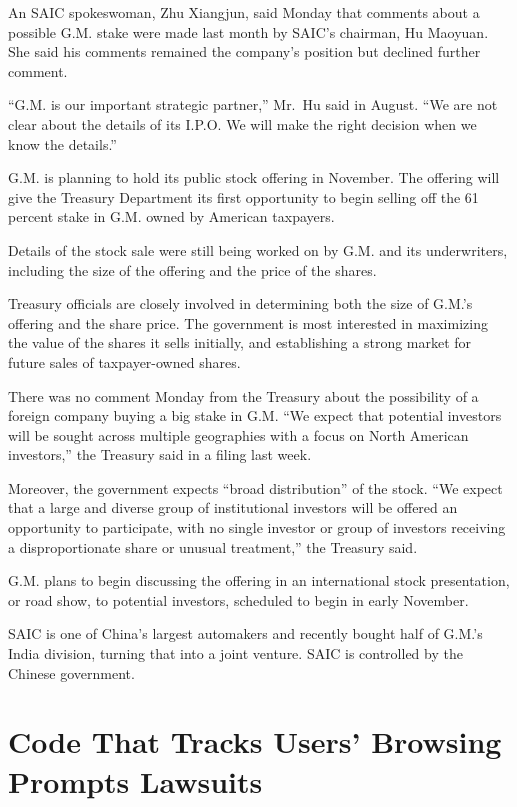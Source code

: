 ﻿\documentclass[12pt]{article}
\begin{document}
An SAIC spokeswoman, Zhu Xiangjun, said Monday that comments about a possible G.M. stake were made
last month by SAIC's chairman, Hu Maoyuan. She said his comments remained the company's position but
declined further comment.

``G.M. is our important strategic partner,'' Mr.~Hu said in August. ``We are not clear about the
details of its I.P.O. We will make the right decision when we know the details.''

G.M. is planning to hold its public stock offering in November. The offering will give the Treasury
Department its first opportunity to begin selling off the 61 percent stake in G.M. owned by American
taxpayers.

Details of the stock sale were still being worked on by G.M. and its underwriters, including the
size of the offering and the price of the shares.

Treasury officials are closely involved in determining both the size of G.M.'s offering and the
share price. The government is most interested in maximizing the value of the shares it sells
initially, and establishing a strong market for future sales of taxpayer-owned shares.

There was no comment Monday from the Treasury about the possibility of a foreign company buying a
big stake in G.M. ``We expect that potential investors will be sought across multiple geographies
with a focus on North American investors,'' the Treasury said in a filing last week.

Moreover, the government expects ``broad distribution'' of the stock. ``We expect that a large and
diverse group of institutional investors will be offered an opportunity to participate, with no
single investor or group of investors receiving a disproportionate share or unusual treatment,'' the
Treasury said.

G.M. plans to begin discussing the offering in an international stock presentation, or road show, to
potential investors, scheduled to begin in early November.

SAIC is one of China's largest automakers and recently bought half of G.M.'s India division, turning
that into a joint venture. SAIC is controlled by the Chinese government.

\pagebreak
\section{Code That Tracks Users' Browsing Prompts Lawsuits}
\end{document}
